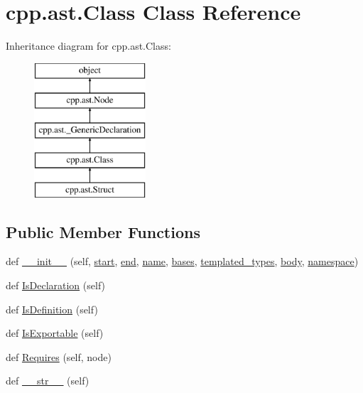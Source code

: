 \hypertarget{classcpp_1_1ast_1_1_class}{}\section{cpp.\+ast.\+Class Class Reference}
\label{classcpp_1_1ast_1_1_class}
Inheritance diagram for cpp.\+ast.\+Class\+:\begin{figure}[H]
\begin{center}
\leavevmode
\includegraphics[height=5.000000cm]{dd/d99/classcpp_1_1ast_1_1_class}
\end{center}
\end{figure}
\subsection*{Public Member Functions}
\begin{DoxyCompactItemize}
\item 
def \mbox{\hyperlink{classcpp_1_1ast_1_1_class_acc17c34512d5cc54d5125734ce79f219}{\+\_\+\+\_\+init\+\_\+\+\_\+}} (self, \mbox{\hyperlink{classcpp_1_1ast_1_1_node_a7b2aa97e6a049bb1a93aea48c48f1f44}{start}}, \mbox{\hyperlink{classcpp_1_1ast_1_1_node_a3c5e5246ccf619df28eca02e29d69647}{end}}, \mbox{\hyperlink{classcpp_1_1ast_1_1___generic_declaration_af774f4729dfd78d0538a6782fe8514c1}{name}}, \mbox{\hyperlink{classcpp_1_1ast_1_1_class_a5665eb67314a075d4e0ff91accbde5d1}{bases}}, \mbox{\hyperlink{classcpp_1_1ast_1_1_class_a48ed0d3115656554d9134bc1787390fa}{templated\+\_\+types}}, \mbox{\hyperlink{classcpp_1_1ast_1_1_class_add39f61fdcf6dae42d79cac3dcbb7782}{body}}, \mbox{\hyperlink{classcpp_1_1ast_1_1___generic_declaration_a8aee3f11b37449d54b42a78e0a689f46}{namespace}})
\item 
def \mbox{\hyperlink{classcpp_1_1ast_1_1_class_a4758bfb7c00410575932974e1ed8b7da}{Is\+Declaration}} (self)
\item 
def \mbox{\hyperlink{classcpp_1_1ast_1_1_class_ae6d2356f835d06d5109d9e4609d86780}{Is\+Definition}} (self)
\item 
def \mbox{\hyperlink{classcpp_1_1ast_1_1_class_a1ab749f8cfddb0903c6484791f70f42e}{Is\+Exportable}} (self)
\item 
def \mbox{\hyperlink{classcpp_1_1ast_1_1_class_a347673e0a2a7b840b7d2d1cae13977f7}{Requires}} (self, node)
\item 
def \mbox{\hyperlink{classcpp_1_1ast_1_1_class_a0a63f6fab75d61ffac6fb9f1c29ae84d}{\+\_\+\+\_\+str\+\_\+\+\_\+}} (self)
\end{DoxyCompactItemize}
